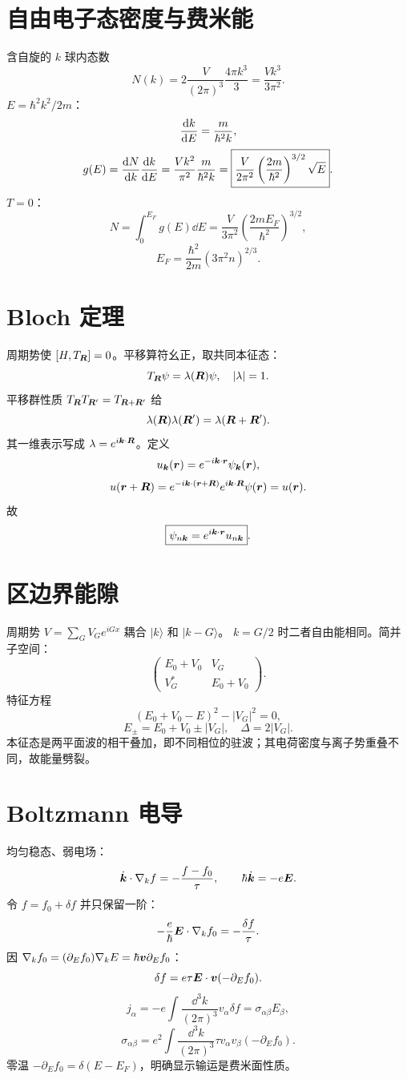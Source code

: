\section{自由电子态密度与费米能}
含自旋的 $k$ 球内态数
\[
N(k)=2\frac V{(2\pi)^3}\frac{4\pi k^3}{3}
=\frac{Vk^3}{3\pi^2}.
\]
$E=\hbar^2k^2/2m$：
\[
\frac{\mathrm d k}{\mathrm d E}=\frac m{\hbar^2k},
\]
\[
g(E)=\frac{\mathrm d N}{\mathrm d k}\frac{\mathrm d k}{\mathrm d E}
=\frac{Vk^2}{\pi^2}\frac m{\hbar^2k}
=\boxed{\frac V{2\pi^2}
\left(\frac{2m}{\hbar^2}\right)^{3/2}\sqrt E}.
\]
$T=0$：
\[
N=\int_0^{E_F}g(E)\dd E
=\frac V{3\pi^2}
\left(\frac{2mE_F}{\hbar^2}\right)^{3/2},
\]
\[
\boxed{E_F=\frac{\hbar^2}{2m}(3\pi^2n)^{2/3}}.
\]

\section{Bloch 定理}
周期势使
$[H,T_{\bm{R}}]=0$。平移算符幺正，取共同本征态：
\[
T_{\bm{R}}\psi=\lambda(\bm{R})\psi,\quad|\lambda|=1.
\]
平移群性质
$T_{\bm{R}}T_{\bm{R}'}=T_{\bm{R}+\bm{R}'}$ 给
\[
\lambda(\bm{R})\lambda(\bm{R}')
=\lambda(\bm{R}+\bm{R}').
\]
其一维表示写成
$\lambda=e^{i\bm{k}\cdot\bm{R}}$。定义
\[
u_{\bm{k}}(\bm{r})=e^{-i\bm{k}\cdot\bm{r}}\psi_{\bm{k}}(\bm{r}),
\]
\[
u(\bm{r}+\bm{R})
=e^{-i\bm{k}\cdot(\bm{r}+\bm{R})}
e^{i\bm{k}\cdot\bm{R}}\psi(\bm{r})=u(\bm{r}).
\]
故
\[
\boxed{\psi_{n\bm{k}}=e^{i\bm{k}\cdot\bm{r}}u_{n\bm{k}}}.
\]

\section{区边界能隙}
周期势
$V=\sum_GV_Ge^{iGx}$ 耦合 $|k\rangle$ 和 $|k-G\rangle$。
$k=G/2$ 时二者自由能相同。简并子空间：
\[
\begin{pmatrix}
E_0+V_0&V_G\\
V_G^*&E_0+V_0
\end{pmatrix}.
\]
特征方程
\[
(E_0+V_0-E)^2-|V_G|^2=0,
\]
\[
E_\pm=E_0+V_0\pm|V_G|,
\quad\boxed{\Delta=2|V_G|}.
\]
本征态是两平面波的相干叠加，即不同相位的驻波；其电荷密度与离子势重叠不同，故能量劈裂。

\section{Boltzmann 电导}
均匀稳态、弱电场：
\[
\dot{\bm{k}}\cdot\nabla_kf
=-\frac{f-f_0}{\tau},\qquad
\hbar\dot{\bm{k}}=-e\bm{E}.
\]
令 $f=f_0+\delta f$ 并只保留一阶：
\[
-\frac e\hbar\bm{E}\cdot\nabla_kf_0
=-\frac{\delta f}{\tau}.
\]
因
$\nabla_kf_0=(\partial_Ef_0)\nabla_kE
=\hbar\bm{v}\partial_Ef_0$：
\[
\delta f=e\tau\bm{E}\cdot\bm{v}(-\partial_Ef_0).
\]
\[
j_\alpha=-e\int\frac{\dd^3k}{(2\pi)^3}
v_\alpha\delta f
=\sigma_{\alpha\beta}E_\beta,
\]
\[
\boxed{\sigma_{\alpha\beta}
=e^2\int\frac{\dd^3k}{(2\pi)^3}
\tau v_\alpha v_\beta(-\partial_Ef_0)}.
\]
零温 $-\partial_Ef_0=\delta(E-E_F)$，明确显示输运是费米面性质。

